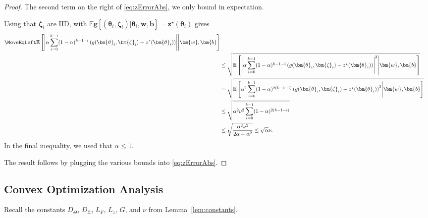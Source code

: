 \documentclass[twoside]{article}
\theoremstyle{definition}
\newcommand{\E}{\mathbb{E}}
\newcommand{\cZ}{\mathcal{Z}}
\newcommand{\1}[1]{\scalebox{1.25}{$\mathds{1}$}\left[#1\right]}
\begin{document}
\begin{proof}
The second term on the right of \eqref{eq:zErrorAbs}, we only bound in expectation.

Using that $\bm{\zeta}_i$ are IID, with $\E\bm{g}[(\bm{\theta}_i,\bm{\zeta}_i)|\bm{\theta}_i,\bm{w},\bm{b}]=\bm{z}^\star(\bm{\theta}_i)$ gives
\begin{align*}
\MoveEqLeft
\E\left[\left|\alpha \sum_{i=0}^{k-1}(1-\alpha)^{k-1-i}\left(
g(\bm{\theta}_i,\bm{\zeta}_i)-z^\star(\bm{\theta}_i)\right)
\right|
\middle|\bm{w},\bm{b}
\right]\\
&\le 
\sqrt{
\E\left[\left|\alpha \sum_{i=0}^{k-1}(1-\alpha)^{k-1-i}\left(
g(\bm{\theta}_i,\bm{\zeta}_i)-z^\star(\bm{\theta}_i)\right)
\right|^2\middle|\bm{w},\bm{b}\right]
} \\
&=\sqrt{
\E\left[
\alpha^2 \sum_{i=0}^{k-1}(1-\alpha)^{2(k-1-i)}
\left(
g(\bm{\theta}_i,\bm{\zeta}_i)-z^\star(\bm{\theta}_i)\right)^2
\middle|\bm{w},\bm{b}\right]
}
\\
&\le\sqrt{
\alpha^2 \nu^2 \sum_{i=0}^{k-1}(1-\alpha)^{2(k-1-i)}
}\\
&\le \sqrt{
\frac{
\alpha^2\nu^2
}{2\alpha-\alpha^2}
}\le \sqrt{\alpha}\nu.
\end{align*}
In the final inequality, we used that $\alpha \le 1$.

The result follows by plugging the various bounds into \eqref{eq:zErrorAbs}.
\end{proof}

\subsection{Convex Optimization Analysis}
\label{appss:cvx}



Recall the constants $D_{\Theta}$, $D_{\cZ}$, $L_F$, $L_z$, $G$, and $\nu$ from Lemma~\ref{lem:constants}.
\end{document}
